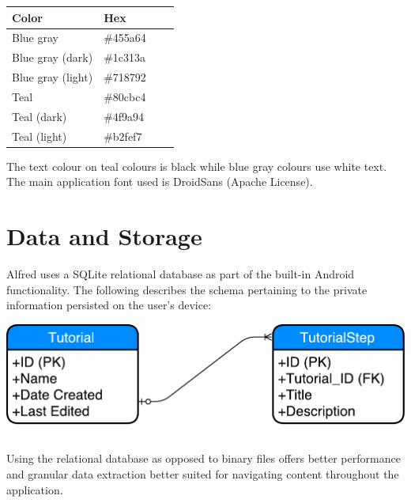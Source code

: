 \documentclass[12pt]{article}
\begin{document}
\begin{center}
    \begin{tabular}{ | l | l | l | p{5cm} |}
    \hline
     Color & Hex \\ \hline
     Blue gray & {\color[RGB]{69,90,100} \#455a64} \\ \hline
     Blue gray (dark) & {\color[RGB]{28,49,58} \#1c313a} \\ \hline
     Blue gray (light) & {\color[RGB]{113,135,146} \#718792} \\ \hline
     Teal & {\color[RGB]{128,203,196} \#80cbc4} \\
     Teal (dark) & {\color[RGB]{79,154,148} \#4f9a94} \\
     Teal (light) & {\color[RGB]{178,254,247} \#b2fef7} \\
    \hline
    \end{tabular}
\end{center}

The text colour on teal colours is black while blue gray colours use white text. The main application font used is DroidSans (Apache License).

\section{Data and Storage}

Alfred uses a SQLite relational database as part of the built-in Android functionality. The following describes the schema pertaining to the private information persisted on the user's device:

\begin{center}
\includegraphics[scale=0.5]{images/schema.pdf}
\end{center}

Using the relational database as opposed to binary files offers better performance and granular data extraction better suited for navigating content throughout the application.
\end{document}
